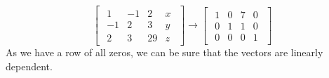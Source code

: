 \documentclass{article}
\begin{document}
\begin{description}
\[                            \]
                            \[
                            \begin{bmatrix}
                            \begin{array}{ccc|c}
                                1  & -1 & 2 & x \\
                                -1 & 2  & 3 & y \\
                                2  & 3  & 29 & z
                            \end{array}
                            \end{bmatrix}
                            \rightarrow
                            \begin{bmatrix}
                            \begin{array}{ccc|c}
                                1 & 0 & 7 & 0 \\
                                0 & 1 & 1 & 0 \\
                                0 & 0 & 0 & 1
                            \end{array}
                            \end{bmatrix}
                            \]
                            As we have a row of all zeros, we can be sure that the vectors are linearly dependent.

                    \end{description}
\end{document}
